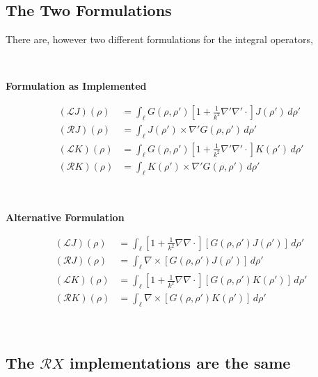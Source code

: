 \documentclass{article}
\newcommand{\0}{\varnothing}
\begin{document}
\subsection{The Two Formulations}

There are, however two different formulations for the integral operators,

\begin{minipage}{0.45\textwidth}
\ \\
\begin{center} \bf Formulation as Implemented\end{center}
\begin{align*}
    (\mathcal{L}J)(\rho) &= \int_{\ell}G(\rho,\rho')[1+\frac{1}{k^2}\nabla'\nabla'\cdotp]J(\rho') \,d\rho'\\
    (\mathcal{R}J)(\rho) &= \int_{\ell} J(\rho') \times \nabla'  G(\rho,\rho')\,d\rho'\\
    (\mathcal{L}K)(\rho) &= \int_{\ell}G(\rho,\rho')[1+\frac{1}{k^2}\nabla'\nabla'\cdotp]K(\rho') \,d\rho'\\
    (\mathcal{R}K)(\rho) &= \int_{\ell} K(\rho') \times \nabla' G(\rho,\rho') \,d\rho'
\end{align*}
\end{minipage}
\begin{minipage}{0.45\textwidth}
\ \\
\begin{center} \bf  Alternative Formulation \end{center}
\begin{align*}
    (\mathcal{L}J)(\rho) &= \int_{\ell}[1+\frac{1}{k^2}\nabla\nabla\cdotp] [G(\rho,\rho')J(\rho')] \,d\rho'\\
    (\mathcal{R}J)(\rho) &= \int_{\ell}\nabla \times [G(\rho,\rho')J(\rho')] \,d\rho'\\
    (\mathcal{L}K)(\rho) &= \int_{\ell}[1+\frac{1}{k^2}\nabla\nabla\cdotp] [G(\rho,\rho')K(\rho')] \,d\rho'\\
    (\mathcal{R}K)(\rho) &= \int_{\ell}\nabla \times [G(\rho,\rho')K(\rho')] \,d\rho'
\end{align*}
\end{minipage}
\ \\

\subsection{The $\mathcal{R}X$ implementations are the same}
\end{document}
